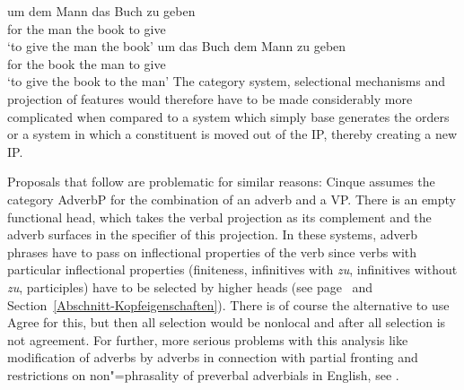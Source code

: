 \eal
\ex 
\gll um dem Mann das Buch zu geben\\
     for the man the book to give\\
\glt `to give the man the book'
\ex 
\gll um das Buch dem Mann zu geben\\
     for the book the man to give\\
\glt `to give the book to the man'
\zl
The category system, selectional mechanisms and projection of features would therefore have to be made
considerably more complicated when compared to a system which simply base generates the orders or a
system in which a constituent is moved out of the IP, thereby creating a new IP. 

Proposals that follow \citet{Cinque99a-u} are problematic for similar reasons: Cinque assumes the
category AdverbP for the combination of an adverb and a VP. There is an empty functional head, which
takes the verbal projection as its complement and the adverb surfaces in the specifier of this projection. In these systems, adverb phrases have to pass on inflectional
properties of the verb since verbs with particular inflectional properties (finiteness, infinitives with \emph{zu}, infinitives without \emph{zu},
participles) have to be selected by higher heads (see page~\pageref{Beispiel-GPSG-Kopfeigenschaften} and
Section~\ref{Abschnitt-Kopfeigenschaften}). There is of course the alternative to use Agree for this,
but then all selection would be nonlocal and after all selection is not agreement. For further, more serious problems with this analysis like
modification of adverbs by adverbs in connection with partial fronting and restrictions on
non"=phrasality of preverbal adverbials in English, see .

